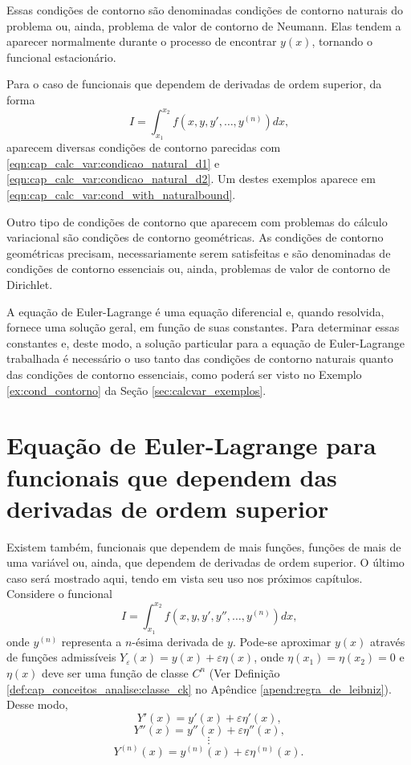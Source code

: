 \documentclass[
	12pt,				%
	openright,			%
    twoside,			%
	a4paper,			%
	chapter=TITLE,		%
	english,			%
	french,				%
	spanish,			%
	brazil				%
	]{abntex2}
\numberwithin{lema}{chapter}
\numberwithin{teorema}{chapter}
\numberwithin{definicao}{chapter}
\numberwithin{exemplo}{chapter}
\numberwithin{figure}{chapter}
\begin{document}
Essas condições de contorno são denominadas condições de contorno naturais do problema ou, ainda, problema de valor de contorno de Neumann. Elas tendem a aparecer normalmente durante o processo de encontrar $y(x)$, tornando o funcional estacionário.

Para o caso de funcionais que dependem de derivadas de ordem superior, da forma
$$
	I=\int_{x_1}^{x_2} f(x, y, y', \dots, y^{(n)}) dx
	\text{,}
$$
aparecem diversas condições de contorno parecidas com \eqref{eqn:cap_calc_var:condicao_natural_d1} e \eqref{eqn:cap_calc_var:condicao_natural_d2}. Um destes exemplos aparece em \eqref{eqn:cap_calc_var:cond_with_naturalbound}.

Outro tipo de condições de contorno que aparecem com problemas do cálculo variacional são condições de contorno geométricas. As condições de contorno geométricas precisam, necessariamente serem satisfeitas e são denominadas de condições de contorno essenciais ou, ainda, problemas de valor de contorno de Dirichlet.

A equação de Euler-Lagrange é uma equação diferencial e, quando resolvida, fornece uma solução geral, em função de suas constantes. Para determinar essas constantes e, deste modo, a solução particular para a equação de Euler-Lagrange trabalhada é necessário o uso tanto das condições de contorno naturais quanto das condições de contorno essenciais, como poderá ser visto no Exemplo \ref{ex:cond_contorno} da Seção \ref{sec:calcvar_exemplos}.

\section{Equação de Euler-Lagrange para funcionais que dependem das derivadas de ordem superior}
\label{sec:eq_euler_lagrange_superior}

Existem também, funcionais que dependem de mais funções, funções de mais de uma variável ou, ainda, que dependem de derivadas de ordem superior. O último caso será mostrado aqui, tendo em vista seu uso nos próximos capítulos. Considere o funcional
\begin{equation}
	\label{eqn:cap_calc_var:funcional_n_derivadas}
	I=\int_{x_1}^{x_2} f(x, y, y', y'', \dots, y^{(n)})dx
	\text{,}
\end{equation}
onde $y^{(n)}$ representa a $n$-ésima derivada de $y$. Pode-se aproximar $y(x)$ através de funções admissíveis $Y_{\varepsilon}(x)=y(x)+\varepsilon \eta (x)$, onde $\eta(x_1)=\eta(x_2)=0$ e $\eta(x)$ deve ser uma função de classe $C^n$ (Ver Definição \ref{def:cap_conceitos_analise:classe_ck} no Apêndice \ref{apend:regra_de_leibniz}). Desse modo,
$$
	Y'(x)=y'(x)+\varepsilon \eta ' (x)
	\text{,}
$$
$$
	Y''(x)=y''(x)+\varepsilon \eta '' (x)
	\text{,}
$$
$$
	\vdots
$$
$$
	Y^{(n)} (x)= y^{(n)}(x)+\varepsilon \eta^{(n)} (x)
	\text{.}
$$
\end{document}

